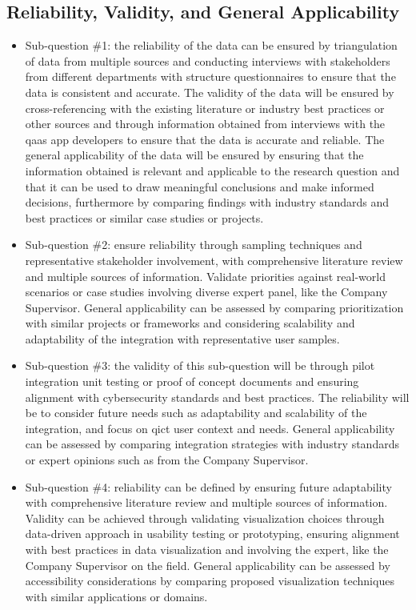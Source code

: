 \subsection{Reliability, Validity, and General Applicability}
\begin{itemize}[label=-]
      \item Sub-question \#1: the reliability of the data can be ensured by triangulation of data from
            multiple sources and conducting interviews with stakeholders from different departments with
            structure questionnaires to ensure that the data is consistent and accurate. The validity of
            the data will be ensured by  cross-referencing with the existing literature or industry best
            practices or other sources and  through information obtained from  interviews with the
            \acrshort{qaas} app developers to ensure  that the data is accurate and reliable. The general
            applicability of the data will be ensured by  ensuring that the information obtained is relevant
            and applicable to the research question and  that it can be used to draw meaningful conclusions
            and make informed decisions, furthermore by comparing findings with industry standards and best
            practices or similar case studies or projects.
      \item Sub-question \#2: ensure reliability through sampling techniques and representative stakeholder
            involvement, with comprehensive literature review and multiple sources of information. Validate
            priorities against real-world scenarios or case studies involving diverse expert panel, like
            the Company Supervisor. General applicability can be assessed by comparing prioritization with
            similar projects or frameworks and considering scalability and adaptability of the integration
            with representative user samples.
      \item Sub-question \#3: the validity of this sub-question will be through pilot integration unit testing
            or proof of concept documents and ensuring alignment with cybersecurity standards and best
            practices. The reliability will be to consider future needs such as adaptability and scalability of
            the integration, and focus on \acrshort{qict} user context and needs. General applicability can be
            assessed by comparing integration strategies with industry standards or expert opinions such as from
            the Company Supervisor.
      \item Sub-question \#4: reliability can be defined by ensuring future adaptability with comprehensive
            literature review and multiple sources of information. Validity can be achieved through validating
            visualization choices through data-driven approach in usability testing or  prototyping, ensuring
            alignment with best practices in data visualization and involving the expert, like the Company
            Supervisor on the field. General applicability can be assessed by accessibility considerations by
            comparing proposed visualization techniques with similar applications or domains.
\end{itemize}
